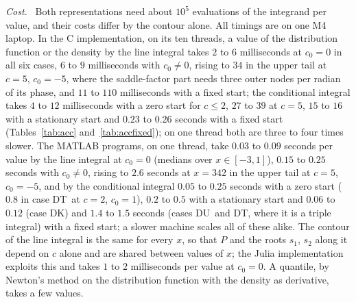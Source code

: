 \documentclass[ecta,nameyear,final,supplement]{econsocart}
\newcommand{\Fk}{\textsf{\upshape DK}}
\newcommand{\Fu}{\textsf{\upshape DU}}
\newcommand{\Ft}{\textsf{\upshape DT}}
\theoremstyle{plain}
\theoremstyle{definition}
\newcommand{\runin}[1]{\par\medskip\noindent\textit{#1.}\ \ignorespaces}
\begin{document}
\runin{Cost}  Both representations need about $10^5$ evaluations of the integrand per value, and their costs differ by the contour alone.  All timings are on one M4 laptop.  In the C implementation, on its ten threads, a value of the distribution function or the density by the line integral takes $2$ to $6$ milliseconds at $c_0=0$ in all six cases, $6$ to $9$ milliseconds with $c_0\ne0$, rising to $34$ in the upper tail at $c=5$, $c_0=-5$, where the saddle-factor part needs three outer nodes per radian of its phase, and $11$ to $110$ milliseconds with a fixed start; the conditional integral takes $4$ to $12$ milliseconds with a zero start for $c\le2$, $27$ to $39$ at $c=5$, $15$ to $16$ with a stationary start and $0.23$ to $0.26$ seconds with a fixed start (Tables~\ref{tab:acc} and~\ref{tab:accfixed}); on one thread both are three to four times slower.  The MATLAB programs, on one thread, take $0.03$ to $0.09$ seconds per value by the line integral at $c_0=0$ (medians over $x\in[-3,1]$), $0.15$ to $0.25$ seconds with $c_0\ne0$, rising to $2.6$ seconds at $x=342$ in the upper tail at $c=5$, $c_0=-5$, and by the conditional integral $0.05$ to $0.25$ seconds with a zero start ($0.8$ in case \Ft\ at $c=2$, $c_0=1$), $0.2$ to $0.5$ with a stationary start and $0.06$ to $0.12$ (case \Fk) and $1.4$ to $1.5$ seconds (cases \Fu\ and \Ft, where it is a triple integral) with a fixed start; a slower machine scales all of these alike.  The contour of the line integral is the same for every $x$, so that $P$ and the roots $s_1$, $s_2$ along it depend on $c$ alone and are shared between values of $x$; the Julia implementation exploits this and takes $1$ to $2$ milliseconds per value at $c_0=0$.  A quantile, by Newton's method on the distribution function with the density as derivative, takes a few values.
\end{document}
